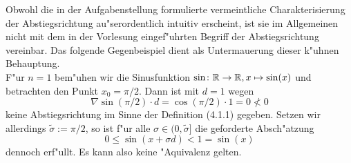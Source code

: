 Obwohl die in der Aufgabenstellung formulierte vermeintliche Charakterisierung
der Abstiegsrichtung au"serordentlich intuitiv erscheint, ist sie im Allgemeinen
nicht mit dem in der Vorlesung eingef"uhrten Begriff der Abstiegsrichtung vereinbar.
Das folgende Gegenbeispiel dient als Untermauerung dieser k"uhnen Behauptung.\\

F"ur $n=1$ bem"uhen wir die Sinusfunktion $\sin\colon\mathbb{R}\to\mathbb{R}, x\mapsto\sin(x)$
und betrachten den Punkt $x_0 = \pi /2$. Dann ist mit $d=1$ wegen
\[
\nabla \sin(\pi/2)\cdot d = \cos(\pi/2) \cdot 1 = 0 \nless 0
\]
keine Abstiegsrichtung im Sinne der Definition (4.1.1) gegeben. Setzen wir allerdings
$\widetilde{\sigma} := \pi/2$, so ist f"ur alle $\sigma\in (0,\widetilde{\sigma}]$
die geforderte Absch"atzung
\[
0 \le \sin(x + \sigma d) < 1 = \sin(x)
\]
dennoch erf"ullt. Es kann also keine "Aquivalenz gelten.
